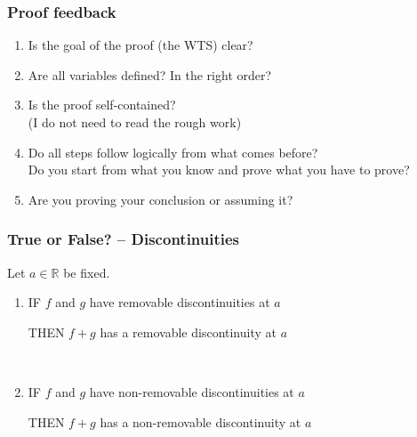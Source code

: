 \documentclass[14pt]{beamer}
\begin{document}
\begin{frame}[t]
\frametitle{Proof feedback}

\begin{enumerate}
	\item  Is the goal of the proof (the WTS) clear?
	\item  Are all variables defined?  In the right order? 
	\item  Is the proof self-contained?  \\
	 (I do not need to read the rough work)
	\item  Do all steps follow logically from what comes before? \\
	Do you start from what you know and prove what you have to prove? \\
	\item  Are you proving your conclusion or assuming it?
\end{enumerate}
\end{frame}


\begin{frame}
\frametitle{True or False? -- Discontinuities}

	Let $a\in\mathbb R$ be fixed.

	\begin{enumerate}
		\item IF $f$ and $g$ have removable discontinuities at $a$
		
			THEN  $f+g$ has a removable discontinuity at $a$
		
		\
		\item IF $f$ and $g$ have non-removable discontinuities at $a$
		
			THEN $f+g$ has a non-removable discontinuity at $a$
	\end{enumerate}


\end{frame}
\end{document}
